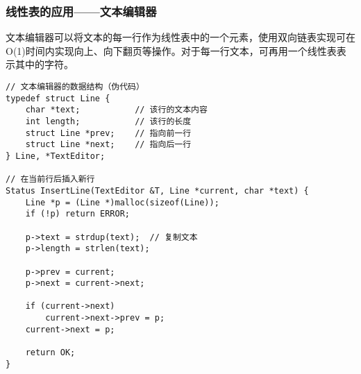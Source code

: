 \documentclass{../../note}
\begin{document}
\subsubsection{线性表的应用——文本编辑器}
文本编辑器可以将文本的每一行作为线性表中的一个元素，使用双向链表实现可在O(1)时间内实现向上、向下翻页等操作。对于每一行文本，可再用一个线性表表示其中的字符。

\begin{verbatim}
// 文本编辑器的数据结构（伪代码）
typedef struct Line {
    char *text;           // 该行的文本内容
    int length;           // 该行的长度
    struct Line *prev;    // 指向前一行
    struct Line *next;    // 指向后一行
} Line, *TextEditor;

// 在当前行后插入新行
Status InsertLine(TextEditor &T, Line *current, char *text) {
    Line *p = (Line *)malloc(sizeof(Line));
    if (!p) return ERROR;

    p->text = strdup(text);  // 复制文本
    p->length = strlen(text);

    p->prev = current;
    p->next = current->next;

    if (current->next)
        current->next->prev = p;
    current->next = p;

    return OK;
}
\end{verbatim}
\end{document}
